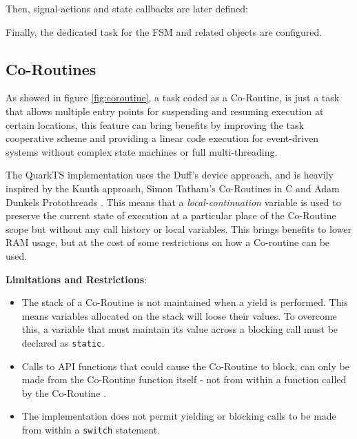 

Then, signal-actions and state callbacks are later defined:



Finally, the dedicated task for the FSM and related objects are configured.



\subsection{Co-Routines}
As showed in figure \ref{fig:coroutine}, a task coded as a Co-Routine, is just a task that allows multiple entry points for suspending and resuming execution at certain locations, this feature can bring benefits by improving the task cooperative scheme and providing a linear code execution for event-driven systems without complex state machines or full multi-threading.
\medskip


    
The QuarkTS implementation uses the Duff's device approach, and is heavily inspired by the Knuth approach\cite{knuth}, Simon Tatham's Co-Routines in C \cite{tatham} and Adam Dunkels Protothreads \cite{dunkels}. This means that a \textit{local-continuation} variable is used to preserve the current state of execution at a particular place of the Co-Routine scope but without any call history or local variables. This brings benefits to lower RAM usage, but at the cost of some restrictions on how a Co-routine can be used.
\medskip

\textbf{Limitations and Restrictions}:

\begin{itemize}
    \item The stack of a Co-Routine  is not maintained when a yield is performed. This means variables allocated on the stack will loose their values. To overcome this, a variable that must maintain its value across a blocking call must be declared as \lstinline{static}.
    \item Calls to API functions that could cause the Co-Routine to block, can only be made from the Co-Routine  function itself - not from within a function called by the Co-Routine .
    \item The implementation does not permit yielding or blocking calls to be made from within a \lstinline{switch} statement.
\end{itemize}

